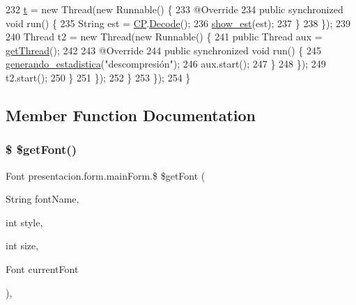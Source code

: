 \begin{DoxyCode}
232                         \hyperlink{classpresentacion_1_1form_1_1mainForm_a4643a7a227b8b65874d63d33a5adfc33}{t} = \textcolor{keyword}{new} Thread(\textcolor{keyword}{new} Runnable() \{
233                             @Override
234                             \textcolor{keyword}{public} \textcolor{keyword}{synchronized} \textcolor{keywordtype}{void} run() \{
235                                 String est = \hyperlink{classpresentacion_1_1form_1_1mainForm_a4d01396f002d4f9bd18db3877057c77b}{CP}.\hyperlink{classpresentacion_1_1Ctrl__Presentacio_1_1Ctrl__Presentacio_adc652f63ed7619207a94a3a58b6bdd77}{Decode}();
236                                 \hyperlink{classpresentacion_1_1form_1_1mainForm_a6eb9e9b4f7bb6da2c592a5a0294a6a06}{show\_est}(est);
237                             \}
238                         \});
239 
240                         Thread t2 = \textcolor{keyword}{new} Thread(\textcolor{keyword}{new} Runnable() \{
241                             \textcolor{keyword}{public} Thread aux = \hyperlink{classpresentacion_1_1form_1_1mainForm_ac6348f8bdef39bfa651f145c00664320}{getThread}();
242 
243                             @Override
244                             \textcolor{keyword}{public} \textcolor{keyword}{synchronized} \textcolor{keywordtype}{void} run() \{
245                                 \hyperlink{classpresentacion_1_1form_1_1mainForm_a34580a4b6e2c162d35ab5502f0ac7e4c}{generando\_estadistica}(\textcolor{stringliteral}{"descompresión"});
246                                 aux.start();
247                             \}
248                         \});
249                         t2.start();
250                     \}
251                 \});
252             \}
253         \});
254     \}
\end{DoxyCode}


\subsection{Member Function Documentation}
\mbox{\label{classpresentacion_1_1form_1_1mainForm_ac3c0e7ddfb95355efa609e2a7b85d34b}} 
\subsubsection{\texorpdfstring{\$ \$get\+Font()}{$ $getFont()}}
{\footnotesize\ttfamily Font presentacion.\+form.\+main\+Form.\$ \$get\+Font (\begin{DoxyParamCaption}\item[{String}]{font\+Name,  }\item[{int}]{style,  }\item[{int}]{size,  }\item[{Font}]{current\+Font }\end{DoxyParamCaption})\hspace{0.3cm}{\ttfamily [inline]}, {\ttfamily [private]}}

